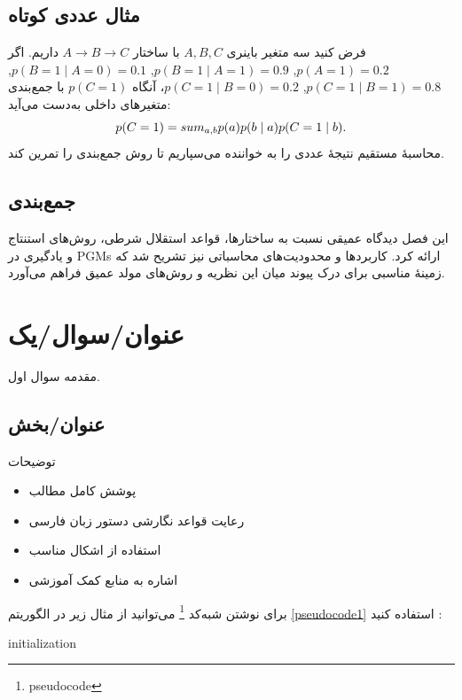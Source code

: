 \section{مثال عددی کوتاه}
فرض کنید سه متغیر باینری $A,B,C$ با ساختار $A\to B\to C$ داریم. اگر $p(A=1)=0.2$, $p(B=1\mid A=1)=0.9$, $p(B=1\mid A=0)=0.1$, $p(C=1\mid B=1)=0.8$, $p(C=1\mid B=0)=0.2$، آنگاه $p(C=1)$ با جمع‌بندی متغیرهای داخلی به‌دست می‌آید:
$$
p(C=1)=\\sum_{a,b} p(a)p(b\mid a)p(C=1\mid b).
$$
محاسبهٔ مستقیم نتیجهٔ عددی را به خواننده می‌سپاریم تا روش جمع‌بندی را تمرین کند.

\section{جمع‌بندی}
این فصل دیدگاه عمیقی نسبت به ساختارها، قواعد استقلال شرطی، روش‌های استنتاج و یادگیری در PGMs ارائه کرد. کاربردها و محدودیت‌های محاسباتی نیز تشریح شد که زمینهٔ مناسبی برای درک پیوند میان این نظریه و روش‌های مولد عمیق فراهم می‌آورد.

\def \Subject {عنوان/سوال/یک}
\def \Session { یک}
\renewcommand{\chaptername}{سوال}
\chapter{\Subject}

مقدمه سوال اول.

\section{عنوان/بخش}
توضیحات
\begin{itemize}
    \item    
     پوشش کامل مطالب
    \item    
     رعایت قواعد نگارشی دستور زبان فارسی
    \item    
     استفاده از اشکال مناسب
    \item    
     اشاره به منابع کمک آموزشی
\end{itemize}


برای نوشتن شبه‌کد
 \footnote{pseudocode}
 می‌توانید از مثال زیر در الگوریتم
  \ref{pseudocode1}
   استفاده کنید :

\begin{latin}
\begin{algorithm}[H]
    initialization\;
    \label{pseudocode1}
    \caption{How to write algorithms}
\end{algorithm}
\end{latin}

